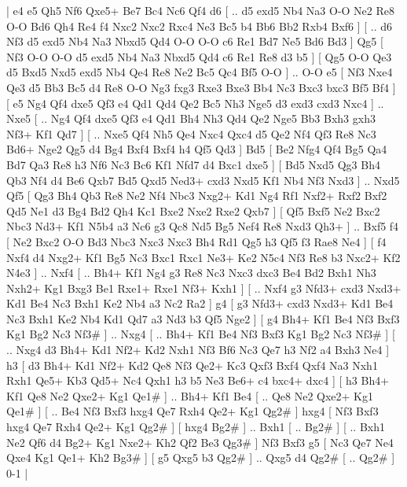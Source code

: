 \makegametitle 
|   e4   e5    Qh5   Nf6    Qxe5+   Be7    Bc4   Nc6    Qf4   d6 [ .. d5  exd5 Nb4  Na3 O-O  Ne2 Re8  O-O Bd6  Qh4 Re4  f4 Nxc2  Nxc2 Rxc4  Ne3 Bc5  b4 Bb6  Bb2 Rxb4  Bxf6   ]  [ .. d6  Nf3 d5  exd5 Nb4  Na3 Nbxd5  Qd4 O-O  O-O c6  Re1 Bd7  Ne5 Bd6  Bd3   ]  Qg5 [  Nf3 O-O  O-O d5  exd5 Nb4  Na3 Nbxd5  Qd4 c6  Re1 Re8  d3 b5   ]  [  Qg5 O-O  Qe3 d5  Bxd5 Nxd5  exd5 Nb4  Qe4 Re8  Ne2 Bc5  Qc4 Bf5  O-O   ] .. O-O    e5 [  Nf3 Nxe4  Qe3 d5  Bb3 Bc5  d4 Re8  O-O Ng3  fxg3 Rxe3  Bxe3 Bb4  Nc3 Bxc3  bxc3 Bf5  Bf4   ]  [  e5 Ng4  Qf4 dxe5  Qf3 e4  Qd1 Qd4  Qe2 Bc5  Nh3 Nge5  d3 exd3  cxd3 Nxc4   ] .. Nxe5 [ .. Ng4  Qf4 dxe5  Qf3 e4  Qd1 Bh4  Nh3 Qd4  Qe2 Nge5  Bb3 Bxh3  gxh3 Nf3+  Kf1 Qd7   ]  [ .. Nxe5  Qf4 Nh5  Qe4 Nxc4  Qxc4 d5  Qe2 Nf4  Qf3 Re8  Nc3 Bd6+  Nge2 Qg5  d4 Bg4  Bxf4 Bxf4  h4 Qf5  Qd3   ]  Bd5 [  Be2 Nfg4  Qf4 Bg5  Qa4 Bd7  Qa3 Re8  h3 Nf6  Nc3 Bc6  Kf1 Nfd7  d4 Bxc1  dxe5   ]  [  Bd5 Nxd5  Qg3 Bh4  Qb3 Nf4  d4 Be6  Qxb7 Bd5  Qxd5 Ned3+  cxd3 Nxd5  Kf1 Nb4  Nf3 Nxd3   ] .. Nxd5    Qf5 [  Qg3 Bh4  Qb3 Re8  Ne2 Nf4  Nbc3 Nxg2+  Kd1 Ng4  Rf1 Nxf2+  Rxf2 Bxf2  Qd5 Ne1  d3 Bg4  Bd2 Qh4  Kc1 Bxe2  Nxe2 Rxe2  Qxb7   ]  [  Qf5 Bxf5  Ne2 Bxc2  Nbc3 Nd3+  Kf1 N5b4  a3 Nc6  g3 Qc8  Nd5 Bg5  Nef4 Re8  Nxd3 Qh3+   ] .. Bxf5    f4 [  Ne2 Bxc2  O-O Bd3  Nbc3 Nxc3  Nxc3 Bh4  Rd1 Qg5  h3 Qf5  f3 Rae8  Ne4   ]  [  f4 Nxf4  d4 Nxg2+  Kf1 Bg5  Nc3 Bxc1  Rxc1 Ne3+  Ke2 N5c4  Nf3 Re8  b3 Nxc2+  Kf2 N4e3   ] .. Nxf4 [ .. Bh4+  Kf1 Ng4  g3 Re8  Nc3 Nxc3  dxc3 Be4  Bd2 Bxh1  Nh3 Nxh2+  Kg1 Bxg3  Be1 Rxe1+  Rxe1 Nf3+  Kxh1   ]  [ .. Nxf4  g3 Nfd3+  cxd3 Nxd3+  Kd1 Be4  Nc3 Bxh1  Ke2 Nb4  a3 Nc2  Ra2   ]  g4 [  g3 Nfd3+  cxd3 Nxd3+  Kd1 Be4  Nc3 Bxh1  Ke2 Nb4  Kd1 Qd7  a3 Nd3  b3 Qf5  Nge2   ]  [  g4 Bh4+  Kf1 Be4  Nf3 Bxf3  Kg1 Bg2  Nc3 Nf3#   ] .. Nxg4 [ .. Bh4+  Kf1 Be4  Nf3 Bxf3  Kg1 Bg2  Nc3 Nf3#   ]  [ .. Nxg4  d3 Bh4+  Kd1 Nf2+  Kd2 Nxh1  Nf3 Bf6  Nc3 Qe7  h3 Nf2  a4 Bxh3  Ne4   ]  h3 [  d3 Bh4+  Kd1 Nf2+  Kd2 Qe8  Nf3 Qe2+  Kc3 Qxf3  Bxf4 Qxf4  Na3 Nxh1  Rxh1 Qe5+  Kb3 Qd5+  Nc4 Qxh1  h3 b5  Ne3 Be6+  c4 bxc4+  dxc4   ]  [  h3 Bh4+  Kf1 Qe8  Ne2 Qxe2+  Kg1 Qe1#   ] .. Bh4+    Kf1   Be4 [ .. Qe8  Ne2 Qxe2+  Kg1 Qe1#   ]  [ .. Be4  Nf3 Bxf3  hxg4 Qe7  Rxh4 Qe2+  Kg1 Qg2#   ]  hxg4 [  Nf3 Bxf3  hxg4 Qe7  Rxh4 Qe2+  Kg1 Qg2#   ]  [  hxg4 Bg2#   ] .. Bxh1 [ .. Bg2#   ]  [ .. Bxh1  Ne2 Qf6  d4 Bg2+  Kg1 Nxe2+  Kh2 Qf2  Be3 Qg3#   ]  Nf3   Bxf3    g5 [  Nc3 Qe7  Ne4 Qxe4  Kg1 Qe1+  Kh2 Bg3#   ]  [  g5 Qxg5  b3 Qg2#   ] .. Qxg5    d4   Qg2#    [ .. Qg2#   ] 0-1  |
